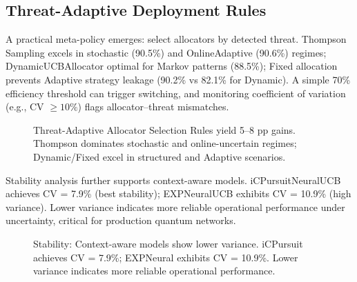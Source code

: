 \documentclass[11pt,a4paper]{article}
\begin{document}
\subsection{Threat-Adaptive Deployment Rules}

A practical meta-policy emerges: select allocators by detected threat. Thompson Sampling excels in stochastic (90.5\%) and OnlineAdaptive (90.6\%) regimes; DynamicUCBAllocator optimal for Markov patterns (88.5\%); Fixed allocation prevents Adaptive strategy leakage (90.2\% vs 82.1\% for Dynamic). A simple 70\% efficiency threshold can trigger switching, and monitoring coefficient of variation (e.g., CV $\geq 10\%$) flags allocator--threat mismatches.

\begin{figure}[tb]
\centering
{}
\caption{Threat-Adaptive Allocator Selection Rules yield 5--8 pp gains. Thompson dominates stochastic and online-uncertain regimes; Dynamic/Fixed excel in structured and Adaptive scenarios.}
\label{fig:threat_rules}
\end{figure}

Stability analysis further supports context-aware models. iCPursuitNeuralUCB achieves CV = 7.9\% (best stability); EXPNeuralUCB exhibits CV = 10.9\% (high variance). Lower variance indicates more reliable operational performance under uncertainty, critical for production quantum networks.

\begin{figure}[tb]
\centering
{}
\caption{Stability: Context-aware models show lower variance. iCPursuit achieves CV = 7.9\%; EXPNeural exhibits CV = 10.9\%. Lower variance indicates more reliable operational performance.}
\label{fig:stability}
\end{figure}
\end{document}
